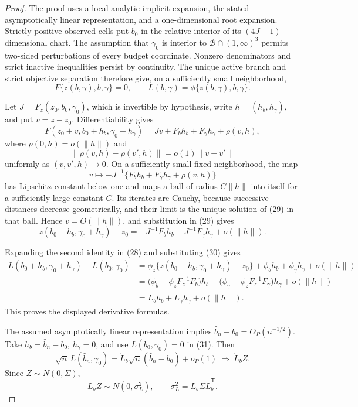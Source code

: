 \documentclass{article}
\begin{document}
\begin{proof}
The proof uses a local analytic implicit expansion, the stated asymptotically linear representation, and a one-dimensional root expansion.  Strictly positive observed cells put \(b_0\) in the relative interior of its \((4J-1)\)-dimensional chart.  The assumption that \(\gamma_0\) is interior to \(\mathcal B\cap(1,\infty)^3\) permits two-sided perturbations of every budget coordinate.  Nonzero denominators and strict inactive inequalities persist by continuity.  The unique active branch and strict objective separation therefore give, on a sufficiently small neighborhood,
\[
 F\{z(b,\gamma),b,\gamma\}=0,
 \qquad
 L(b,\gamma)=\phi\{z(b,\gamma),b,\gamma\}.                             \tag{28}
\]

Let \(J=F_z(z_0,b_0,\gamma_0)\), which is invertible by hypothesis, write \(h=(h_b,h_\gamma)\), and put \(v=z-z_0\).  Differentiability gives
\[
 F(z_0+v,b_0+h_b,\gamma_0+h_\gamma)
 =Jv+F_bh_b+F_\gamma h_\gamma+\rho(v,h),                               \tag{29}
\]
where \(\rho(0,h)=o(\|h\|)\) and
\[
 \|\rho(v,h)-\rho(v',h)\|=o(1)\|v-v'\|
\]
uniformly as \((v,v',h)\to0\).  On a sufficiently small fixed neighborhood, the map
\[
 v\longmapsto-J^{-1}\{F_bh_b+F_\gamma h_\gamma+\rho(v,h)\}
\]
has Lipschitz constant below one and maps a ball of radius \(C\|h\|\) into itself for a sufficiently large constant \(C\).  Its iterates are Cauchy, because successive distances decrease geometrically, and their limit is the unique solution of (29) in that ball.  Hence \(v=O(\|h\|)\), and substitution in (29) gives
\[
 z(b_0+h_b,\gamma_0+h_\gamma)-z_0
 =-J^{-1}F_bh_b-J^{-1}F_\gamma h_\gamma+o(\|h\|).                      \tag{30}
\]

Expanding the second identity in (28) and substituting (30) gives
\[
\begin{aligned}
 L(b_0+h_b,\gamma_0+h_\gamma)-L(b_0,\gamma_0)
 &=\phi_z\{z(b_0+h_b,\gamma_0+h_\gamma)-z_0\}
   +\phi_bh_b+\phi_\gamma h_\gamma+o(\|h\|)\\
 &=\bigl(\phi_b-\phi_zF_z^{-1}F_b\bigr)h_b
   +\bigl(\phi_\gamma-\phi_zF_z^{-1}F_\gamma\bigr)h_\gamma
   +o(\|h\|)\\
 &=\dot L_bh_b+\dot L_\gamma h_\gamma+o(\|h\|).
\end{aligned}                                                           \tag{31}
\]
This proves the displayed derivative formulas.

The assumed asymptotically linear representation implies \(\widehat b_n-b_0=O_P(n^{-1/2})\).  Take \(h_b=\widehat b_n-b_0\), \(h_\gamma=0\), and use \(L(b_0,\gamma_0)=0\) in (31).  Then
\[
 \sqrt n\,L(\widehat b_n,\gamma_0)
 =\dot L_b\sqrt n(\widehat b_n-b_0)+o_P(1)
 \ \Longrightarrow\ \dot L_bZ.                                      \tag{32}
\]
Since \(Z\sim N(0,\Sigma)\),
\[
 \dot L_bZ\sim N(0,\sigma_L^2),
 \qquad \sigma_L^2=\dot L_b\Sigma\dot L_b^{\mathsf T}.               \tag{33}
\]


\end{proof}
\end{document}
